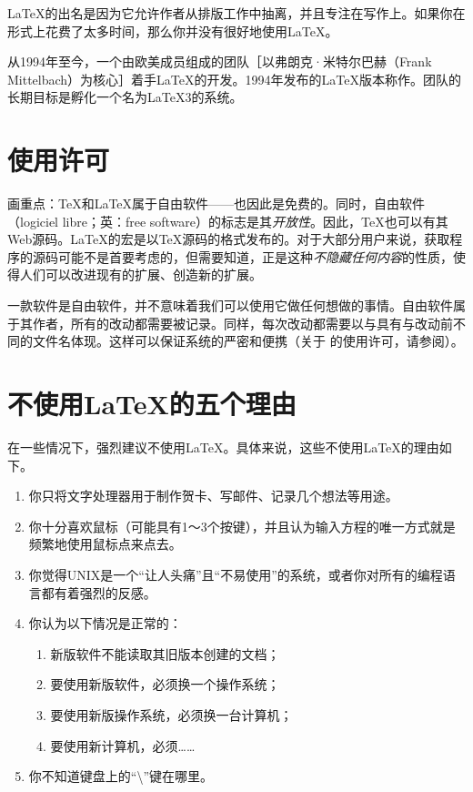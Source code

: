 \begin{origincitation}
    \LaTeX 的出名是因为它允许作者从排版工作中抽离，并且专注在写作上。如果你在形式上花费了太多时间，那么你并没有很好地使用\LaTeX 。
\end{origincitation}

从1994年至今，一个由欧美成员组成的团队［以弗朗克·米特尔巴赫（Frank Mittelbach）为核心］着手\LaTeX 的开发。1994年发布的\LaTeX 版本称作\LaTeXe。团队的长期目标是孵化一个名为\LaTeX 3的系统。

\section*{使用许可}

画重点：\TeX 和\LaTeX 属于自由软件——也因此是免费的。同时，自由软件（logiciel libre；英：free software）的标志是其\emph{开放性}。因此，\TeX 也可以有其Web源码。\LaTeX 的宏是以\TeX 源码的格式发布的。对于大部分用户来说，获取程序的源码可能不是首要考虑的，但需要知道，正是这种\emph{不隐藏任何内容}的性质，使得人们可以改进现有的扩展、创造新的扩展。

一款软件是自由软件，并不意味着我们可以使用它做任何想做的事情。自由软件属于其\linebreak 作者，所有的改动都需要被记录。同样，每次改动都需要以与具有与改动前不同的\linebreak 文件名体现。这样可以保证系统的严密和便携（关于 \LaTeXe  的使用许可，请参阅\linebreak {}）。

\section*{不使用\LaTeX 的五个理由}

在一些情况下，强烈建议不使用\LaTeX 。具体来说，这些不使用\LaTeX 的理由如下。

\begin{enumerate}
    \item 你只将文字处理器用于制作贺卡、写邮件、记录几个想法等用途。
    \item 你十分喜欢鼠标（可能具有1～3个按键），并且认为输入方程的唯一方式就是频繁地使用鼠标点来点去。
    \item 你觉得UNIX是一个“让人头痛”且“不易使用”的系统，或者你对所有的编程语言都有着强烈的反感。
    \item 你认为以下情况是正常的：
        \begin{enumerate}
            \item 新版软件不能读取其旧版本创建的文档；
            \item 要使用新版软件，必须换一个操作系统；
            \item 要使用新版操作系统，必须换一台计算机；
            \item 要使用新计算机，必须……
        \end{enumerate}
    \item 你不知道键盘上的“\backslash”键在哪里。
\end{enumerate}

